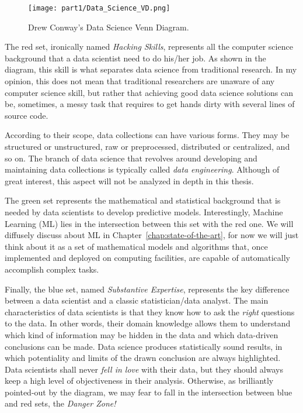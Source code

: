\begin{figure}[h!]
	\centering
	\texttt{[image: part1/Data\_Science\_VD.png]}
	\caption{Drew Conway's Data Science Venn Diagram.} \label{fig:data_science_venn_diagram}
\end{figure}

The red set, ironically named \textit{Hacking Skills}, represents all the computer science background that a data scientist need to do his/her job. As shown in the diagram, this  skill is what separates data science from traditional research. In my opinion, this does not mean that traditional researchers are unaware of any computer science skill, but rather that achieving good data science solutions can be, sometimes, a messy task that requires to get hands dirty with several lines of source code.


According to their scope, data collections can have various forms. They may be structured or unstructured, raw or preprocessed, distributed or centralized, and so on. The branch of data science that revolves around developing and maintaining data collections is typically called \textit{data engineering}. Although of great interest, this aspect will not be analyzed in depth in this thesis.

The green set represents the mathematical and statistical background that is needed by data scientists to develop predictive models. Interestingly, Machine Learning (\ac{ML}) lies in the intersection between this set with the red one. We will diffusely discuss about ML in Chapter~\ref{chap:state-of-the-art}, for now we will just think about it as a set of mathematical models and algorithms that, once implemented and deployed on computing facilities, are capable of automatically accomplish complex tasks.

Finally, the blue set, named \textit{Substantive Expertise}, represents the key difference between a data scientist and a classic statistician/data analyst. The main characteristics of data scientists is that they know how to ask the \textit{right} questions to the data. In other words, their domain knowledge allows them to understand which kind of information may be hidden in the data and which data-driven conclusions can be made. Data science produces statistically sound results, in which potentiality and limits of the drawn conclusion are always highlighted. Data scientists shall never \textit{fell in love} with their data, but they should always keep a high level of objectiveness in their analysis. Otherwise, as brilliantly pointed-out by the diagram, we may fear to fall in the intersection between blue and red sets, the \textit{Danger Zone!}


